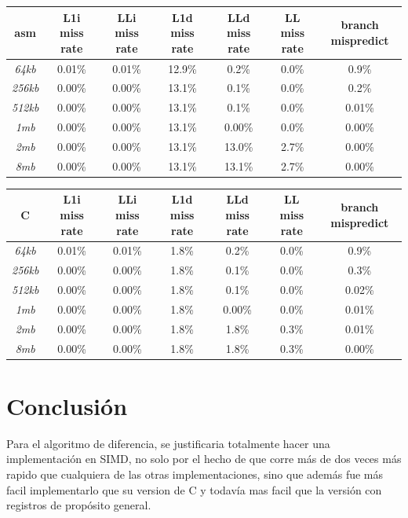 \documentclass[a4paper]{article}
\begin{document}
\begin{center}
	\begin{tabular}[c]{|c|c|c|c|c|c|c|}
    \hline
        \textbf{asm} &  \textbf{L1i miss rate} & \textbf{LLi miss rate} & \textbf{L1d miss rate} & \textbf{LLd miss rate} & \textbf{LL miss rate} & \textbf{branch mispredict}\\
        \hline
\textit{64kb} &    0.01\%  & 0.01\% & 12.9\% & 0.2\% & 0.0\% & 0.9\% \\
        \hline
\textit{256kb} &   0.00\%    & 0.00\% & 13.1\% & 0.1\% & 0.0\% & 0.2\% \\
        \hline
\textit{512kb} & 0.00\%    & 0.00\% & 13.1\%   &   0.1\% & 0.0\% & 0.01\% \\
        \hline
\textit{1mb} &  0.00\%    & 0.00\% & 13.1\%  & 0.00\%  & 0.0\% & 0.00\% \\
        \hline
\textit{2mb} &  0.00\%    & 0.00\% & 13.1\% & 13.0\% & 2.7\% & 0.00\% \\
        \hline
\textit{8mb} &  0.00\%    & 0.00\% & 13.1\% & 13.1\% & 2.7\% & 0.00\% \\
        \hline
    \end{tabular}
    
    
    	\begin{tabular}[c]{|c|c|c|c|c|c|c|}
    \hline
        \textbf{C} &  \textbf{L1i miss rate} & \textbf{LLi miss rate} & \textbf{L1d miss rate} & \textbf{LLd miss rate} & \textbf{LL miss rate} & \textbf{branch mispredict}\\
        \hline
\textit{64kb} &    0.01\%  & 0.01\% & 1.8\% & 0.2\% & 0.0\% & 0.9\% \\
        \hline
\textit{256kb} &   0.00\%    & 0.00\% & 1.8\% & 0.1\% & 0.0\% & 0.3\% \\
        \hline
\textit{512kb} & 0.00\%    & 0.00\% & 1.8\%   &   0.1\% & 0.0\% & 0.02\% \\
        \hline
\textit{1mb} &  0.00\%    & 0.00\% & 1.8\%  & 0.00\%  & 0.0\% & 0.01\% \\
        \hline
\textit{2mb} &  0.00\%    & 0.00\% & 1.8\% & 1.8\% & 0.3\% & 0.01\% \\
        \hline
\textit{8mb} &  0.00\%    & 0.00\% & 1.8\% & 1.8\% & 0.3\% & 0.00\% \\
        \hline
    \end{tabular}
\end{center}

\section{Conclusión}

 Para el algoritmo de diferencia, se justificaria totalmente hacer una implementación en SIMD, no solo por el hecho de que corre más de dos veces más rapido que cualquiera de las otras implementaciones, sino que además fue más facil implementarlo que su version de C y todavía mas facil que la versión con registros de propósito general. 





\nocite{*}
\end{document}

